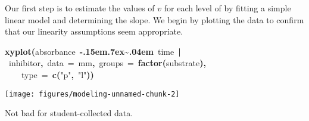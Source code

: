 \documentclass{article}\usepackage{graphicx, color}
\makeatletter
\newcommand{\hlfunctioncall}[1]{\textcolor[rgb]{0.501960784313725,0,0.329411764705882}{\textbf{#1}}}%
\newcommand{\hlstring}[1]{\textcolor[rgb]{0.6,0.6,1}{#1}}%
\newcommand{\hlkeyword}[1]{\textcolor[rgb]{0,0,0}{\textbf{#1}}}%
\newcommand{\hlargument}[1]{\textcolor[rgb]{0.690196078431373,0.250980392156863,0.0196078431372549}{#1}}%
\newcommand{\hlsymbol}[1]{\textcolor[rgb]{0,0,0}{#1}}%
\def\urltilda{\kern -.15em\lower .7ex\hbox{\~{}}\kern .04em}%
\newcommand{\hlstd}[1]{\textcolor[rgb]{0,0,0}{#1}}%
\newenvironment{kframe}{%
 \def\FrameCommand##1{\hskip\@totalleftmargin \hskip-\fboxsep
 \colorbox{shadecolor}{##1}\hskip-\fboxsep
     \hskip-\linewidth \hskip-\@totalleftmargin \hskip\columnwidth}%
 \MakeFramed {\advance\hsize-\width
   \@totalleftmargin\z@ \linewidth\hsize
   \@setminipage}}%
 {\par\unskip\endMakeFramed}
\newenvironment{knitrout}{}{} %
\makeatother
\begin{document}
Our first step is to estimate the values of $v$ for each level of 
by fitting a simple linear model and determining the slope.
We begin by plotting the data to confirm that our linearity assumptions seem
appropriate.
\begin{knitrout}
\color{fgcolor}\begin{kframe}
\begin{flushleft}
\ttfamily\noindent
\hlfunctioncall{xyplot}\hlkeyword{(}\hlsymbol{absorbance}{\ }\hlkeyword{\urltilda{}}{\ }\hlsymbol{time}{\ }\hlkeyword{|}{\ }\hlsymbol{inhibitor}\hlkeyword{,}{\ }\hlargument{data}{\ }\hlargument{=}{\ }\hlsymbol{mm}\hlkeyword{,}{\ }\hlargument{groups}{\ }\hlargument{=}{\ }\hlfunctioncall{factor}\hlkeyword{(}\hlsymbol{substrate}\hlkeyword{)}\hlkeyword{,}\hspace*{\fill}\\
\hlstd{}{\ }{\ }{\ }{\ }\hlargument{type}{\ }\hlargument{=}{\ }\hlfunctioncall{c}\hlkeyword{(}\hlstring{"{}{}p"{}{}}\hlkeyword{,}{\ }\hlstring{"{}{}l"{}{}}\hlkeyword{)}\hlkeyword{)}\mbox{}
\normalfont
\end{flushleft}
\end{kframe}

{\centering \texttt{[image: figures/modeling-unnamed-chunk-2]} 

}


\end{knitrout}

\noindent
Not bad for student-collected data.
\end{document}
